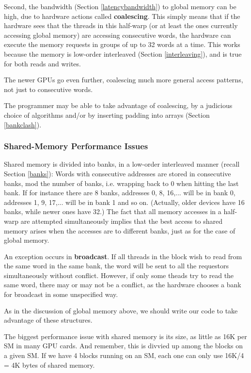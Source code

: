Second, the bandwidth (Section \ref{latencybandwidth}) to global memory
can be high, due to hardware actions called {\bf coalescing}.  This
simply means that if the hardware sees that the threads in this
half-warp (or at least the ones currently accessing global memory) are
accessing consecutive words, the hardware can execute the memory
requests in groups of up to 32 words at a time.  This works because the
memory is low-order interleaved (Section \ref{interleaving}), and is
true for both reads and writes.

The newer GPUs go even further, coalescing much more general access
patterns, not just to consecutive words.

The programmer may be able to take advantage of coalescing, by a
judicious choice of algorithms and/or by inserting padding into arrays
(Section \ref{bankclash}).


\subsubsection{Shared-Memory Performance Issues}

Shared memory is divided into banks, in a low-order interleaved
manner (recall Section \ref{banks}):  Words with consecutive addresses
are stored in consecutive banks, mod the number of banks, i.e.  wrapping
back to 0 when hitting the last bank.  If for instance there are 8
banks, addresses 0, 8, 16,... will be in bank 0, addresses 1, 9, 17,...
will be in bank 1 and so on.  (Actually, older devices have 16 banks,
while newer ones have 32.) The fact that all memory accesses in a
half-warp are attempted simultaneously implies that the best access to
shared memory arises when the accesses are to different banks, just as
for the case of global memory.  

An exception occurs in {\bf broadcast}.  If all threads in the block
wish to read from the same word in the same bank, the word will be sent
to all the requestors simultaneously without conflict.  However, if only
some theads try to read the same word, there may or may not be a
conflict, as the hardware chooses a bank for broadcast in some
unspecified way.

As in the discussion of global memory above, we should write our code to
take advantage of these structures.

The biggest performance issue with shared memory is its size, as little
as 16K per SM in many GPU cards.  And remember, this is divvied up among
the blocks on a given SM.  If we have 4 blocks running on an SM, each
one can only use 16K/4 = 4K bytes of shared memory.

